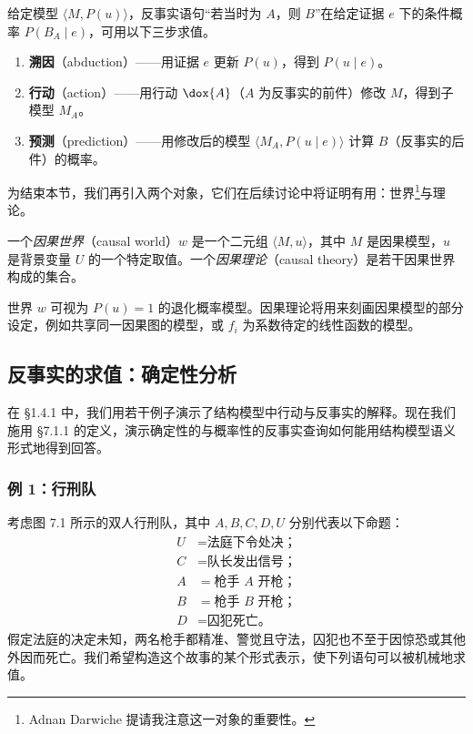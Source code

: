 \begin{theorem}
给定模型 $\langle M,P(u)\rangle$，反事实语句“若当时为 $A$，则 $B$”在给定证据 $e$ 下的条件概率 $P(B_A\mid e)$，可用以下三步求值。
\begin{enumerate}[label=\arabic*.,leftmargin=2.2em]
\item \textbf{溯因}（abduction）——用证据 $e$ 更新 $P(u)$，得到 $P(u\mid e)$。
\item \textbf{行动}（action）——用行动 $\dox{A}$（$A$ 为反事实的前件）修改 $M$，得到子模型 $M_A$。
\item \textbf{预测}（prediction）——用修改后的模型 $\langle M_A,P(u\mid e)\rangle$ 计算 $B$（反事实的后件）的概率。
\end{enumerate}
\end{theorem}

为结束本节，我们再引入两个对象，它们在后续讨论中将证明有用：世界\footnote{Adnan Darwiche 提请我注意这一对象的重要性。}与理论。

\begin{definition}[世界与理论]
一个\emph{因果世界}（causal world）$w$ 是一个二元组 $\langle M,u\rangle$，其中 $M$ 是因果模型，$u$ 是背景变量 $U$ 的一个特定取值。一个\emph{因果理论}（causal theory）是若干因果世界构成的集合。
\end{definition}

世界 $w$ 可视为 $P(u)=1$ 的退化概率模型。因果理论将用来刻画因果模型的部分设定，例如共享同一因果图的模型，或 $f_i$ 为系数待定的线性函数的模型。

\subsection{反事实的求值：确定性分析}

在 \S 1.4.1 中，我们用若干例子演示了结构模型中行动与反事实的解释。现在我们施用 \S 7.1.1 的定义，演示确定性的与概率性的反事实查询如何能用结构模型语义形式地得到回答。

\subsubsection*{例 1：行刑队}

考虑图 7.1 所示的双人行刑队，其中 $A,B,C,D,U$ 分别代表以下命题：
\begin{align*}
U &= \text{法庭下令处决；}\\
C &= \text{队长发出信号；}\\
A &= \text{枪手 $A$ 开枪；}\\
B &= \text{枪手 $B$ 开枪；}\\
D &= \text{囚犯死亡。}
\end{align*}
假定法庭的决定未知，两名枪手都精准、警觉且守法，囚犯也不至于因惊恐或其他外因而死亡。我们希望构造这个故事的某个形式表示，使下列语句可以被机械地求值。

